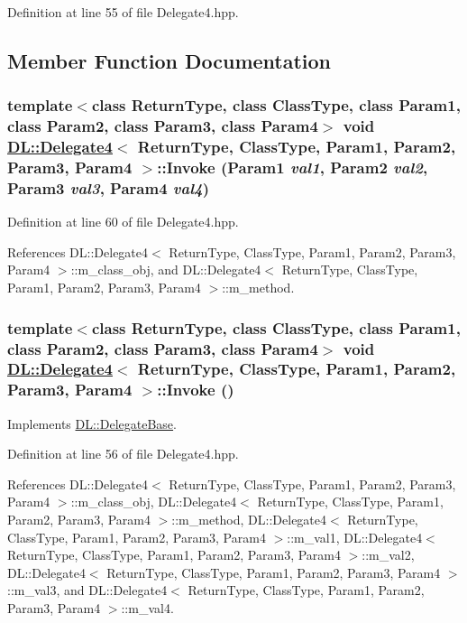 Definition at line 55 of file Delegate4.hpp.

\subsection{Member Function Documentation}
\hypertarget{classDL_1_1Delegate4_a3}{
\subsubsection[Invoke]{\setlength{\rightskip}{0pt plus 5cm}template$<$class Return\-Type, class Class\-Type, class Param1, class Param2, class Param3, class Param4$>$ void \hyperlink{classDL_1_1Delegate4}{DL::Delegate4}$<$ Return\-Type, Class\-Type, Param1, Param2, Param3, Param4 $>$::Invoke (Param1 {\em val1}, Param2 {\em val2}, Param3 {\em val3}, Param4 {\em val4})}}
\label{classDL_1_1Delegate4_a3}




Definition at line 60 of file Delegate4.hpp.

References DL::Delegate4$<$ Return\-Type, Class\-Type, Param1, Param2, Param3, Param4 $>$::m\_\-class\_\-obj, and DL::Delegate4$<$ Return\-Type, Class\-Type, Param1, Param2, Param3, Param4 $>$::m\_\-method.\hypertarget{classDL_1_1Delegate4_a2}{
\subsubsection[Invoke]{\setlength{\rightskip}{0pt plus 5cm}template$<$class Return\-Type, class Class\-Type, class Param1, class Param2, class Param3, class Param4$>$ void \hyperlink{classDL_1_1Delegate4}{DL::Delegate4}$<$ Return\-Type, Class\-Type, Param1, Param2, Param3, Param4 $>$::Invoke ()}}
\label{classDL_1_1Delegate4_a2}




Implements \hyperlink{classDL_1_1DelegateBase_a2}{DL::Delegate\-Base}.

Definition at line 56 of file Delegate4.hpp.

References DL::Delegate4$<$ Return\-Type, Class\-Type, Param1, Param2, Param3, Param4 $>$::m\_\-class\_\-obj, DL::Delegate4$<$ Return\-Type, Class\-Type, Param1, Param2, Param3, Param4 $>$::m\_\-method, DL::Delegate4$<$ Return\-Type, Class\-Type, Param1, Param2, Param3, Param4 $>$::m\_\-val1, DL::Delegate4$<$ Return\-Type, Class\-Type, Param1, Param2, Param3, Param4 $>$::m\_\-val2, DL::Delegate4$<$ Return\-Type, Class\-Type, Param1, Param2, Param3, Param4 $>$::m\_\-val3, and DL::Delegate4$<$ Return\-Type, Class\-Type, Param1, Param2, Param3, Param4 $>$::m\_\-val4.

